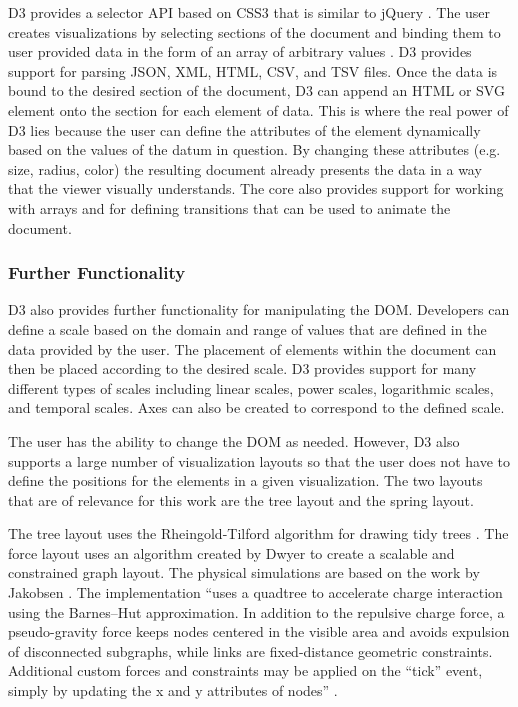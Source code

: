 D3 provides a selector API based on CSS3 that is similar to jQuery \cite{jQuery}. The user creates visualizations by selecting sections of the document and binding them to user provided data in the form of an array of arbitrary values \cite{2011-d3}. D3 provides support for parsing JSON, XML, HTML, CSV, and TSV files. Once the data is bound to the desired section of the document, D3 can append an HTML or SVG element onto the section for each element of data. This is where the real power of D3 lies because the user can define the attributes of the element dynamically based on the values of the datum in question. By changing these attributes (e.g. size, radius, color) the resulting document already presents the data in a way that the viewer visually understands. The core also provides support for working with arrays and for defining transitions that can be used to animate the document.

\subsubsection{Further Functionality}

D3 also provides further functionality for manipulating the DOM. Developers can define a scale based on the domain and range of values that are defined in the data provided by the user. The placement of elements within the document can then be placed according to the desired scale. D3 provides support for many different types of scales including linear scales, power scales, logarithmic scales, and temporal scales. Axes can also be created to correspond to the defined scale.

The user has the ability to change the DOM as needed. However, D3 also supports a large number of visualization layouts so that the user does not have to define the positions for the elements in a given visualization. The two layouts that are of relevance for this work are the tree layout and the spring layout.

The tree layout uses the Rheingold-Tilford algorithm for drawing tidy trees \cite{Reingold81}. The force layout uses an algorithm created by Dwyer \cite{Dwyer2009} to create a scalable and constrained graph layout. The physical simulations are based on the work by Jakobsen \cite{Jakobsen03}. The implementation ``uses a quadtree to accelerate charge interaction using the Barnes–Hut approximation. In addition to the repulsive charge force, a pseudo-gravity force keeps nodes centered in the visible area and avoids expulsion of disconnected subgraphs, while links are fixed-distance geometric constraints. Additional custom forces and constraints may be applied on the ``tick'' event, simply by updating the x and y attributes of nodes'' \cite{D3Wiki}.

